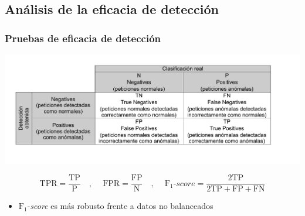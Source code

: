 \subsection{Análisis de la eficacia de detección}

\begin{frame}
    \frametitle{Pruebas de eficacia de detección}

    \begin{center}
        \includegraphics[width=\textwidth, trim=1.1cm 1.7cm 1.6cm 1cm]{images/diagram-score-explanation.pdf}
    \end{center}

    $$
    \text{TPR} = \frac{\text{TP}}{\text{P}}
    \quad , \ \quad
    \text{FPR} = \frac{\text{FP}}{\text{N}}
    \quad , \ \quad
    \text{F}_{1}\textit{-score} = \frac{2 \text{TP}}{2 \text{TP} + \text{FP} + \text{FN}}
    $$

    \begin{itemize}
        \item
        \small $\text{F}_{1}$-\textit{score} es más robusto frente a datos no balanceados
    \end{itemize}
\end{frame}

